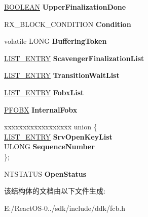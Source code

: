 \begin{DoxyCompactItemize}
\begin{tabbing}
\end{tabbing}\item 
\mbox{\label{struct___s_r_v___o_p_e_n_aafb77a8e87786a01db5b0942cf29148d}} 
\hyperlink{_processor_bind_8h_a112e3146cb38b6ee95e64d85842e380a}{B\+O\+O\+L\+E\+AN} {\bfseries Upper\+Finalization\+Done}
\item 
\mbox{\label{struct___s_r_v___o_p_e_n_aab2f92bcb2fb3166e27d427511f8d155}} 
R\+X\+\_\+\+B\+L\+O\+C\+K\+\_\+\+C\+O\+N\+D\+I\+T\+I\+ON {\bfseries Condition}
\item 
\mbox{\label{struct___s_r_v___o_p_e_n_aad7da387333379df1e35a2315d20e060}} 
volatile L\+O\+NG {\bfseries Buffering\+Token}
\item 
\mbox{\label{struct___s_r_v___o_p_e_n_a1ed8d44484a0ae9cd7ec7b27a1a48657}} 
\hyperlink{struct___l_i_s_t___e_n_t_r_y}{L\+I\+S\+T\+\_\+\+E\+N\+T\+RY} {\bfseries Scavenger\+Finalization\+List}
\item 
\mbox{\label{struct___s_r_v___o_p_e_n_aed99b4b5e950f75fb1624f2ce976d695}} 
\hyperlink{struct___l_i_s_t___e_n_t_r_y}{L\+I\+S\+T\+\_\+\+E\+N\+T\+RY} {\bfseries Transition\+Wait\+List}
\item 
\mbox{\label{struct___s_r_v___o_p_e_n_a762f2d18305979724170097014e571d3}} 
\hyperlink{struct___l_i_s_t___e_n_t_r_y}{L\+I\+S\+T\+\_\+\+E\+N\+T\+RY} {\bfseries Fobx\+List}
\item 
\mbox{\label{struct___s_r_v___o_p_e_n_ab222247600066b32b1e693a7b151a20a}} 
\hyperlink{struct___f_o_b_x}{P\+F\+O\+BX} {\bfseries Internal\+Fobx}
\item 
\mbox{\label{struct___s_r_v___o_p_e_n_a30b38d1def83a3e370b0e411e1aa219e}} 
\begin{tabbing}
xx\=xx\=xx\=xx\=xx\=xx\=xx\=xx\=xx\=\kill
union \{\\
\>\hyperlink{struct___l_i_s_t___e_n_t_r_y}{LIST\_ENTRY} {\bfseries SrvOpenKeyList}\\
\>ULONG {\bfseries SequenceNumber}\\
\}; \\

\end{tabbing}\item 
\mbox{\label{struct___s_r_v___o_p_e_n_a65a87fe7838710568feab3b980aaf2dc}} 
N\+T\+S\+T\+A\+T\+US {\bfseries Open\+Status}
\end{DoxyCompactItemize}


该结构体的文档由以下文件生成\+:\begin{DoxyCompactItemize}
\item 
E\+:/\+React\+O\+S-\/0../sdk/include/ddk/fcb.\+h\end{DoxyCompactItemize}
